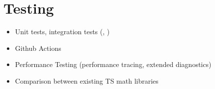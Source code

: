 \chapter{Testing}

\begin{itemize}
  \item Unit tests, integration tests (, )
  \item Github Actions
  \item Performance Testing (performance tracing, extended diagnostics)
  \item Comparison between existing TS math libraries
\end{itemize}